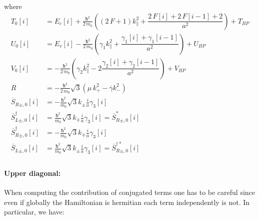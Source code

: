 \documentclass[prb,aps]{revtex4}
\begin{document}
    where
	\begin{align}
		 T_0[i] &= E_c[i] + \frac{ħ^2}{2\,m_0} \left( (2\,F + 1) k_\parallel^2 + \dfrac{2\,F[i] + 2\,F[i-1] + 2}{a^2} \right) + T_{BP} \\
		 U_0[i] &= E_v[i] - \frac{ħ^2 }{2\,m_0} \left( γ_1 k_\parallel^2 + \dfrac{γ_1[i] + γ_1[i-1]}{a^2} \right) + U_{BP}\\
		 V_0[i] &=  - \frac{ħ^2}{2\,m_0} \left( γ_2 k_\parallel^2 - 2 \dfrac{γ_2[i] + γ_2[i-1]}{a^2} \right) + V_{BP}\\
		R &= - \frac{ħ^2}{2\,m_0} \sqrt{3} \left( μ\,k_+^2 - \overline{γ} k_-^2 \right)\\
		 \overline{S}_{R\pm,0}[i] &= -\frac{ħ^2}{m_0} \sqrt{3} k_\pm \frac{i}{a} γ_3[i]\\
		 \overline{S}_{L\pm,0}^\dagger[i] &= \frac{ħ^2}{m_0} \sqrt{3} k_\mp \frac{i}{a} γ_3[i] = \overline{S}_{R\pm,0}^*[i]\\
		 \overline{S}_{R\pm,0}^\dagger[i] &= -\frac{ħ^2}{m_0} \sqrt{3} k_\mp \frac{i}{a} γ_3[i]\\
		 \overline{S}_{L\pm,0}[i] &= \frac{ħ^2}{m_0} \sqrt{3} k_\pm \frac{i}{a} γ_3[i] = \overline{S}_{R\pm,0}^{\dagger*}[i]\\
	\end{align}

	\paragraph{Upper diagonal:\\}
	When computing the contribution of conjugated terms one has to be careful since even if globally the Hamiltonian is hermitian each term independently is not. In particular, we have:
\end{document}
